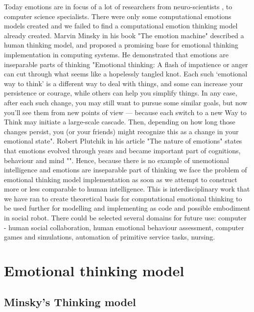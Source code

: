 Today emotions are in focus of a lot of researchers from neuro-scientists \cite{emotionsbraintorobot, parsingreward, neuromodulatory, cubeofemotions}, to computer science specialists\cite{emotionandsociable, senticcomputing, hourglass, affectivemodelofinterplay, affectivecomputing, affectivecomputingchallanges}.
There were only some computational emotions models created\cite{computationalmodelsemotion, computationalmodelsemotionscognition, evaluatingcomutationalmodel, threelevel} and we failed to find a computational emotion thinking model already created. Marvin Minsky in his book "The emotion machine"\cite{emotionmachine} described a human thinking model, and proposed a promising base for emotional thinking implementation in computing systems. He demonstrated that emotions are inseparable parts of thinking "Emotional thinking: A flash of impatience or anger can cut through what seems like a hopelessly tangled knot. Each such ‘emotional way to think' is a different way to deal with things, and some can increase your persistence or courage, while others can help you simplify things.
In any case, after each such change, you may still want to pursue some similar goals, but now you’ll see them from new points of view — because each switch to a new Way to Think may initiate a large-scale cascade. Then, depending on how long those changes persist, you (or your friends) might recognize this as a change in your emotional state". Robert Plutchik in his article "The nature of emotions" \cite{natureofemotions} states that emotions evolved through years and became important part of cognitions, behaviour and mind "". Hence, because there is no example of unemotional intelligence and emotions are inseparable part of thinking we face the problem of emotional thinking model implementation as soon as we attempt to construct more or less comparable to human intelligence. This is interdisciplinary work that we have ran to create theoretical basis for computational emotional thinking to be used further for modelling and implementing as code and possible embodiment in social robot. There could be selected several domains for future use: computer - human social collaboration, human emotional behaviour assessment, computer games and simulations, automation of primitive service tasks, nursing.

\section{Emotional thinking model}

\subsection{Minsky's Thinking model}

